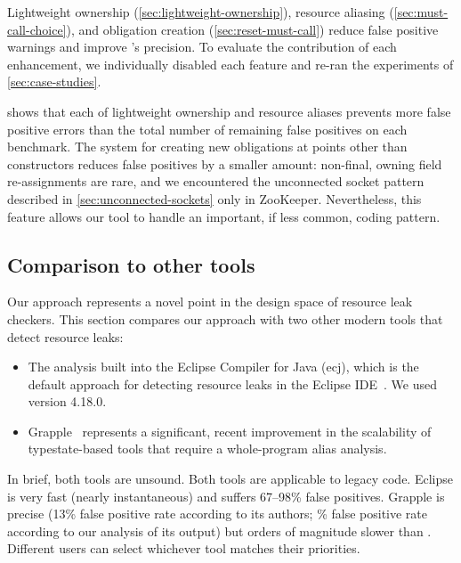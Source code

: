 Lightweight ownership (\cref{sec:lightweight-ownership}),
resource aliasing (\cref{sec:must-call-choice}), and
obligation creation (\cref{sec:reset-must-call})
reduce false positive warnings and improve \tool's precision.
To evaluate the contribution of each enhancement, we individually disabled each
feature and re-ran the experiments of \cref{sec:case-studies}.

 shows that each of lightweight
ownership and resource aliases prevents more false positive errors than the total number
of remaining false positives on each benchmark.
The system for creating new obligations at points other than constructors reduces
false positives by a smaller amount: non-final, owning field re-assignments are rare,
and we encountered the unconnected socket pattern described in \cref{sec:unconnected-sockets}
only in ZooKeeper. Nevertheless, this feature allows our tool to handle an
important, if less common, coding pattern.

\subsection{Comparison to other tools}
\label{sec:compare}

Our approach represents a novel point in the design space of resource leak checkers.
%
This section compares our approach with two other modern tools that detect resource leaks:
\begin{itemize}
\item The analysis built into the Eclipse Compiler for Java (ecj), which is the default approach
  for detecting resource leaks in the Eclipse IDE~\cite{ecj-resource-leak}.
  We used version 4.18.0.
\item Grapple~\cite{zuo2019grapple} represents a significant, recent
  improvement in the scalability of typestate-based tools that require a whole-program alias analysis.
\end{itemize}
In brief, both tools are unsound.
Both tools are applicable to legacy code. %
Eclipse is very fast (nearly instantaneous) and suffers 67--98\% false
positives. %
Grapple is precise (13\% false positive rate
according to its authors; \% false positive rate according to our
analysis of its output) but orders
of magnitude slower than \tool.
Different users can select whichever tool matches
their priorities.

